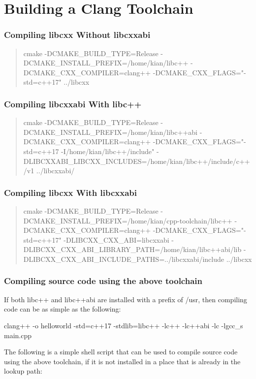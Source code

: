 \chapter{Building a Clang Toolchain}



\subsection{Compiling libcxx Without libcxxabi}
\begin{quote}
cmake -DCMAKE_BUILD_TYPE=Release -DCMAKE_INSTALL_PREFIX=/home/kian/libc++ -DCMAKE_CXX_COMPILER=clang++ -DCMAKE_CXX_FLAGS="-std=c++17" ../libcxx
\end{quote}

\subsection{Compiling libcxxabi With libc++}
\begin{quote}
cmake -DCMAKE_BUILD_TYPE=Release -DCMAKE_INSTALL_PREFIX=/home/kian/libc++abi -DCMAKE_CXX_COMPILER=clang++ -DCMAKE_CXX_FLAGS="-std=c++17 -I/home/kian/libc++/include" -DLIBCXXABI_LIBCXX_INCLUDES=/home/kian/libc++/include/c++/v1 ../libcxxabi/
\end{quote}

\subsection{Compiling libcxx With libcxxabi}
\begin{quote}
cmake -DCMAKE_BUILD_TYPE=Release -DCMAKE_INSTALL_PREFIX=/home/kian/cpp-toolchain/libc++ -DCMAKE_CXX_COMPILER=clang++ -DCMAKE_CXX_FLAGS="-std=c++17" -DLIBCXX_CXX_ABI=libcxxabi -DLIBCXX_CXX_ABI_LIBRARY_PATH=/home/kian/libc++abi/lib -DLIBCXX_CXX_ABI_INCLUDE_PATHS=../libcxxabi/include ../libcxx
\end{quote}

\subsection{Compiling source code using the above toolchain}
If both libc++ and libc++abi are installed with a prefix of /usr, then compiling code can be as simple as the following:

clang++ -o helloworld -std=c++17 -stdlib=libc++ -lc++ -lc++abi -lc -lgcc_s main.cpp

The following is a simple shell script that can be used to compile source code using the above toolchain, if it is not installed in a place that is already in the lookup path:

